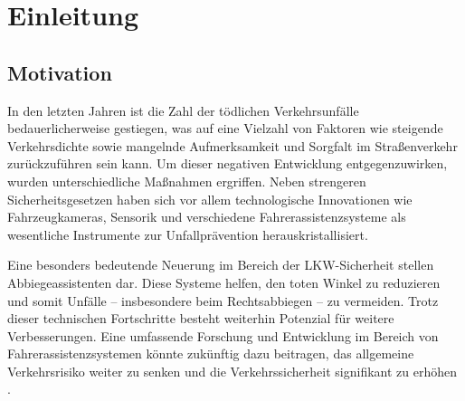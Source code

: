 \documentclass[a4paper, 12pt]{article} %
\begin{document}
\clearpage


\tableofcontents

\clearpage

\setcounter{page}{1}

\section{Einleitung}
\begin{spacing}{1.8}  %
    \fontsize{14pt}{15pt}\selectfont  %

\end{spacing}

    \subsection{Motivation}
\begin{spacing}{1.8}  %
    \fontsize{14pt}{15pt}\selectfont  %

    In den letzten Jahren ist die Zahl der tödlichen Verkehrsunfälle bedauerlicherweise
     gestiegen, was auf eine Vielzahl von Faktoren wie steigende
      Verkehrsdichte sowie mangelnde Aufmerksamkeit und Sorgfalt
       im Straßenverkehr zurückzuführen sein kann. Um dieser
        negativen Entwicklung entgegenzuwirken,
         wurden unterschiedliche Maßnahmen ergriffen. 
         Neben strengeren Sicherheitsgesetzen haben sich vor 
         allem technologische Innovationen wie Fahrzeugkameras, Sensorik und verschiedene Fahrerassistenzsysteme als wesentliche
          Instrumente zur Unfallprävention herauskristallisiert.

        

Eine besonders bedeutende Neuerung im Bereich 
der LKW-Sicherheit stellen Abbiegeassistenten dar.
 Diese Systeme helfen, den toten Winkel zu reduzieren und somit
  Unfälle – insbesondere beim Rechtsabbiegen – zu vermeiden. Trotz dieser technischen Fortschritte besteht 
  weiterhin Potenzial für weitere Verbesserungen. Eine umfassende Forschung und Entwicklung im Bereich von Fahrerassistenzsystemen könnte zukünftig dazu beitragen, 
  das allgemeine Verkehrsrisiko weiter zu senken und die Verkehrssicherheit signifikant zu erhöhen \cite{grunder_simon_2024}.
\end{spacing}
\end{document}
